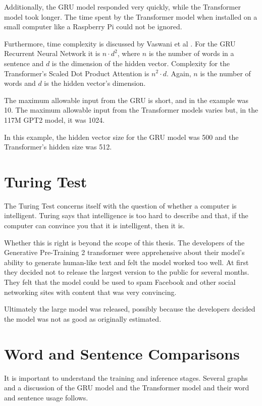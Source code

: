 Additionally, the GRU model responded very quickly, while the Transformer model took longer. The time spent by the Transformer model when installed on a small computer like a Raspberry Pi could not be ignored. 

Furthermore, time complexity is discussed by Vaswani et al \cite{Vaswani2017AttentionIA}. 
For the GRU Recurrent Neural Network it is $ n \cdot d^2 $, where $ n $ is the number of words in a sentence and $ d $ is the dimension of the hidden vector. Complexity for the Transformer's Scaled Dot Product Attention is $ n^2 \cdot  d $. Again, $n$ is the number of words and $d$ is the hidden vector's dimension. 

The maximum allowable input from the GRU is short, and in the example was 10. The maximum allowable input from the Transformer models varies but, in the 117M GPT2 model, it was 1024. 


In this example, the hidden vector size for the GRU model was 500 and %
the Transformer's hidden size was 512.

\section{Turing Test}

The Turing Test concerns itself with the question of whether a computer is intelligent. Turing says that intelligence is too hard to describe and that, if the computer can convince you that it is intelligent, then it is.

Whether this is right is beyond the scope of this thesis. The developers of the Generative Pre-Training 2 transformer were apprehensive about their model's ability to generate human-like text and felt the model worked too well. 
At first they decided not to release the largest version to the public for several months. 
They felt that the model could be used to spam Facebook and other social networking sites with content that was very convincing. 


Ultimately the large model was released, possibly because the developers decided the model was not as good as originally estimated. %

\section{Word and Sentence Comparisons}

It is important to understand the training and inference stages. Several graphs and a discussion of the GRU model and the Transformer model and their word and sentence usage follows.


